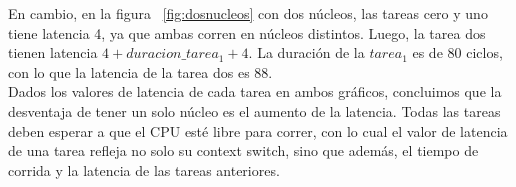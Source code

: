 En cambio, en la figura ~\ref{fig:dosnucleos} con dos núcleos, las tareas cero y uno tiene latencia 4, ya que ambas corren en núcleos distintos. Luego, la tarea  dos tienen latencia $4 + duracion\_tarea_{1} + 4$. La duración de la $tarea_{1}$ es de 80 ciclos, con lo que la latencia de la tarea dos es 88.\\

Dados los valores de latencia de cada tarea en ambos gráficos, concluimos que la desventaja de tener un solo núcleo es el aumento de la latencia. Todas las tareas deben esperar a que el CPU esté libre para correr, con lo cual el valor de latencia de una tarea refleja no solo su context switch, sino que además, el tiempo de corrida y la latencia de las tareas anteriores. 

